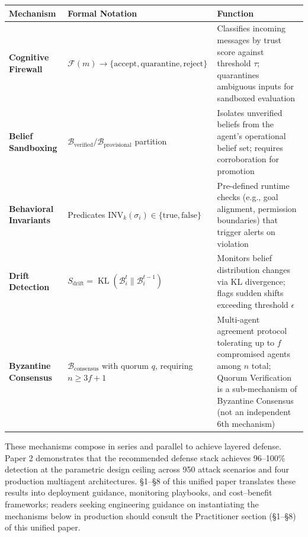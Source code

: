 \documentclass[
]{article}
\newcounter{none} %
\DeclareMathOperator{\KL}{KL}
\begin{document}
{\def\LTcaptype{none} %
\begin{longtable}[]{@{}
  >{\raggedright\arraybackslash}p{}
  >{\raggedright\arraybackslash}p{}
  >{\raggedright\arraybackslash}p{}@{}}
\toprule\noalign{}
\begin{minipage}[b]{\linewidth}\raggedright
Mechanism
\end{minipage} & \begin{minipage}[b]{\linewidth}\raggedright
Formal Notation
\end{minipage} & \begin{minipage}[b]{\linewidth}\raggedright
Function
\end{minipage} \\
\midrule\noalign{}
\endhead
\bottomrule\noalign{}
\endlastfoot
\textbf{Cognitive Firewall} &
\(\mathcal{F}(m) \to \{\text{accept}, \text{quarantine}, \text{reject}\}\)
& Classifies incoming messages by trust score against threshold
\(\tau\); quarantines ambiguous inputs for sandboxed evaluation \\
\textbf{Belief Sandboxing} &
\(\mathcal{B}_{\text{verified}} / \mathcal{B}_{\text{provisional}}\)
partition & Isolates unverified beliefs from the agent's operational
belief set; requires corroboration for promotion \\
\textbf{Behavioral Invariants} & Predicates
\(\text{INV}_k(\sigma_i) \in \{\text{true}, \text{false}\}\) &
Pre-defined runtime checks (e.g., goal alignment, permission boundaries)
that trigger alerts on violation \\
\textbf{Drift Detection} &
\(S_{\text{drift}} = \KL(\mathcal{B}_i^t \| \mathcal{B}_i^{t-1})\) &
Monitors belief distribution changes via KL divergence; flags sudden
shifts exceeding threshold \(\epsilon\) \\
\textbf{Byzantine Consensus} & \(\mathcal{B}_{\text{consensus}}\) with
quorum \(q\), requiring \(n \geq 3f+1\) & Multi-agent agreement protocol
tolerating up to \(f\) compromised agents among \(n\) total; Quorum
Verification is a sub-mechanism of Byzantine Consensus (not an
independent 6th mechanism) \\
\end{longtable}
}

These mechanisms compose in series and parallel to achieve layered
defense. Paper 2 \cite{friedman2026cogsec2} demonstrates that the
recommended defense stack achieves 96--100\% detection at the parametric
design ceiling across 950 attack scenarios and four production
multiagent architectures. §1--§8 of this unified paper translates these
results into deployment guidance, monitoring playbooks, and
cost--benefit frameworks; readers seeking engineering guidance on
instantiating the mechanisms below in production should consult the
Practitioner section (§1--§8) of this unified paper.
\end{document}
